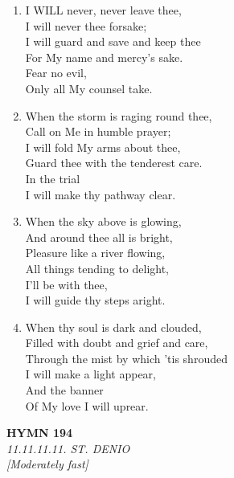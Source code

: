 \documentclass[11pt,a4paper]{article}
\begin{document}
\begin{enumerate}
    \item I WILL never, never leave thee, \\
        I will never thee forsake; \\
        I will guard and save and keep thee \\
        For My name and mercy's sake. \\
        Fear no evil, \\
        Only all My counsel take.

    \item When the storm is raging round thee, \\
        Call on Me in humble prayer; \\
        I will fold My arms about thee, \\
        Guard thee with the tenderest care. \\
        In the trial \\
        I will make thy pathway clear.

    \item When the sky above is glowing, \\
        And around thee all is bright, \\
        Pleasure like a river flowing, \\
        All things tending to delight, \\
        I'll be with thee, \\
        I will guide thy steps aright.

    \item When thy soul is dark and clouded, \\
        Filled with doubt and grief and care, \\
        Through the mist by which 'tis shrouded \\
        I will make a light appear, \\
        And the banner \\
        Of My love I will uprear.

\end{enumerate}

\newpage
\begin{center}
    {\Large \textbf{HYMN 194}}
    \\
    \textit{11.11.11.11. ST. DENIO}
    \\
    \textit{\small [Moderately fast]}
\end{center}
\vspace{1em}
\end{document}

